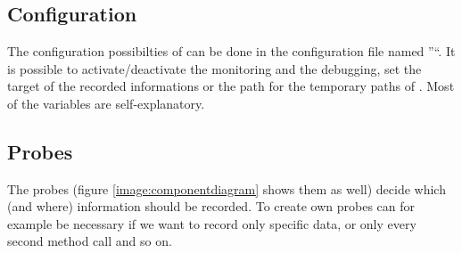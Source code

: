 \documentclass[a4paper, oneside, 11pt]{scrartcl}
\begin{document}
\section{\KiekerMonitoring}
\subsection{Configuration}
The configuration possibilties of \KiekerMonitoring can be done in the configuration file named ''\monitoringPropertiesFile``. It is possible to activate/deactivate the monitoring and the debugging, set the target of the recorded informations or the path for the temporary paths of \Kieker. Most of the variables are self-explanatory.  
\subsection{Probes}
The probes (figure \ref{image:componentdiagram} shows them as well) decide which (and where) information should be recorded. To create own probes can for example be necessary if we want to record only specific data, or only every second method call and so on.
\end{document}
